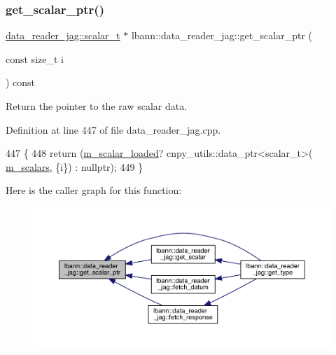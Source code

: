 \subsubsection{\texorpdfstring{get\+\_\+scalar\+\_\+ptr()}{get\_scalar\_ptr()}}
{\footnotesize\ttfamily \hyperlink{classlbann_1_1data__reader__jag_aa2e01bc071588b9c1a583e5a752abcc6}{data\+\_\+reader\+\_\+jag\+::scalar\+\_\+t} $\ast$ lbann\+::data\+\_\+reader\+\_\+jag\+::get\+\_\+scalar\+\_\+ptr (\begin{DoxyParamCaption}\item[{const size\+\_\+t}]{i }\end{DoxyParamCaption}) const}



Return the pointer to the raw scalar data. 



Definition at line 447 of file data\+\_\+reader\+\_\+jag.\+cpp.


\begin{DoxyCode}
447                                                                              \{
448   \textcolor{keywordflow}{return} (\hyperlink{classlbann_1_1data__reader__jag_add9f037609b73da931a4a8a460798db9}{m\_scalar\_loaded}? cnpy\_utils::data\_ptr<scalar\_t>(
      \hyperlink{classlbann_1_1data__reader__jag_ab0ce0a57903e79f029e91356db8b5441}{m\_scalars}, \{i\}) : \textcolor{keyword}{nullptr});
449 \}
\end{DoxyCode}
Here is the caller graph for this function\+:\nopagebreak
\begin{figure}[H]
\begin{center}
\leavevmode
\includegraphics[width=350pt]{classlbann_1_1data__reader__jag_abaa3c00c30ebaa54d395c93f0225570c_icgraph}
\end{center}
\end{figure}
\mbox{\label{classlbann_1_1data__reader__jag_ae3f45a65894cb60343676d75a8b7f99c}} 
